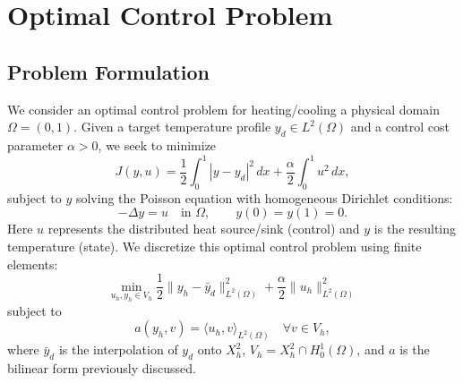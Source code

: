 \documentclass[a4paper,10pt]{article}
\begin{document}
\section{Optimal Control Problem}
\label{sec:optimal_control}

\subsection{Problem Formulation}
We consider an optimal control problem for heating/cooling a physical domain \(\Omega=(0,1)\).
Given a target temperature profile \(y_d \in L^2(\Omega)\) and a control cost parameter \(\alpha > 0\), we seek to minimize
\[
	J(y,u) = \frac{1}{2}\int_0^1 |y-y_d|^2\,dx + \frac{\alpha}{2}\int_0^1 u^2\,dx,
\]
subject to \(y\) solving the Poisson equation with homogeneous Dirichlet conditions:
\[
	-\Delta y = u \quad\text{in }\Omega, \qquad y(0) = y(1) = 0.
\]
Here \(u\) represents the distributed heat source/sink (control) and \(y\) is the resulting temperature (state).
We discretize this optimal control problem using finite elements:
\[
	\min_{u_h,y_h\in V_h} \frac{1}{2}\|y_h - \bar{y}_d\|^2_{L^2(\Omega)} + \frac{\alpha}{2}\|u_h\|^2_{L^2(\Omega)}
\]
subject to
\[
	a(y_h,v) = \langle u_h,v \rangle_{L^2(\Omega)} \quad \forall v\in V_h,
\]
where \(\bar{y}_d\) is the interpolation of \(y_d\) onto \(X^2_h\), \(V_h = X^2_h \cap H^1_0(\Omega)\), and \(a\) is the bilinear form previously discussed.
\end{document}
